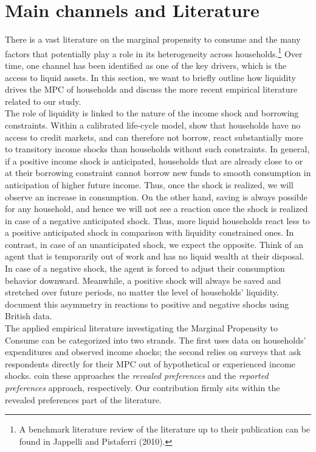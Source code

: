 \section{Main channels and Literature} \label{sec:lit}
There is a vast literature on the marginal propensity to consume and the many factors that potentially play a role in its heterogeneity across households.\footnote{A benchmark literature review of the literature up to their publication can be found in Jappelli and Pistaferri (2010).} Over time, one channel has been identified as one of the key drivers, which is the access to liquid assets. In this section, we want to briefly outline how liquidity drives the MPC of households and discuss the more recent empirical literature related to our study. \\ 
The role of liquidity is linked to the nature of the income shock and borrowing constraints. Within a calibrated life-cycle model, \cite{kaplanviolante_2010} show that households have no access to credit markets, and can therefore not borrow, react substantially more to transitory income shocks than households without such constraints. In general, if a positive income shock is anticipated, households that are already close to or at their borrowing constraint cannot borrow new funds to smooth consumption in anticipation of higher future income. Thus, once the shock is realized, we will observe an increase in consumption. On the other hand, saving is always possible for any household, and hence we will not see a reaction once the shock is realized in case of a negative anticipated shock. Thus, more liquid households react less to a positive anticipated shock in comparison with liquidity constrained ones. In contrast, in case of an unanticipated shock, we expect the opposite. Think of an agent that is temporarily out of work and has no liquid wealth at their disposal. In case of a negative shock, the agent is forced to adjust their consumption behavior downward. Meanwhile, a positive shock will always be saved and stretched over future periods, no matter the level of households' liquidity. \cite{bunnetal_2018} document this asymmetry in reactions to positive and negative shocks using British data.\\
The applied empirical literature investigating the Marginal Propensity to Consume can be categorized into two strands. The first uses data on households' expenditures and observed income shocks; the second relies on surveys that ask respondents directly for their MPC out of hypothetical or experienced income shocks. \cite{parkersouleles_2019} coin these approaches the \textit{revealed preferences} and the \textit{reported preferences} approach, respectively. Our contribution firmly sits within the revealed preferences part of the literature. \\
